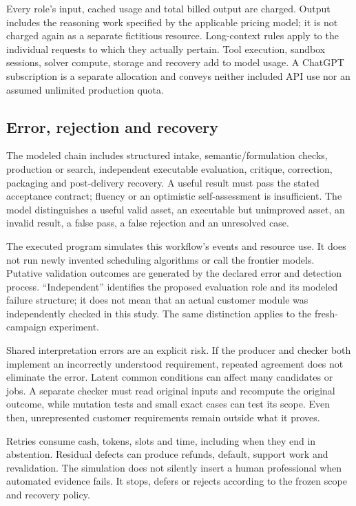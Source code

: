 \documentclass[11pt,a4paper]{article}
\begin{document}
Every role's input, cached usage and total billed output are charged. Output includes the reasoning work specified by the applicable pricing model; it is not charged again as a separate fictitious resource. Long-context rules apply to the individual requests to which they actually pertain. Tool execution, sandbox sessions, solver compute, storage and recovery add to model usage. A ChatGPT subscription is a separate allocation and conveys neither included API use nor an assumed unlimited production quota.



\subsection{Error, rejection and recovery}

The modeled chain includes structured intake, semantic/formulation checks, production or search, independent executable evaluation, critique, correction, packaging and post-delivery recovery. A useful result must pass the stated acceptance contract; fluency or an optimistic self-assessment is insufficient. The model distinguishes a useful valid asset, an executable but unimproved asset, an invalid result, a false pass, a false rejection and an unresolved case.

The executed program simulates this workflow's events and resource use. It does not run newly invented scheduling algorithms or call the frontier models. Putative validation outcomes are generated by the declared error and detection process. ``Independent'' identifies the proposed evaluation role and its modeled failure structure; it does not mean that an actual customer module was independently checked in this study. The same distinction applies to the fresh-campaign experiment.

Shared interpretation errors are an explicit risk. If the producer and checker both implement an incorrectly understood requirement, repeated agreement does not eliminate the error. Latent common conditions can affect many candidates or jobs. A separate checker must read original inputs and recompute the original outcome, while mutation tests and small exact cases can test its scope. Even then, unrepresented customer requirements remain outside what it proves.

Retries consume cash, tokens, slots and time, including when they end in abstention. Residual defects can produce refunds, default, support work and revalidation. The simulation does not silently insert a human professional when automated evidence fails. It stops, defers or rejects according to the frozen scope and recovery policy.
\end{document}
